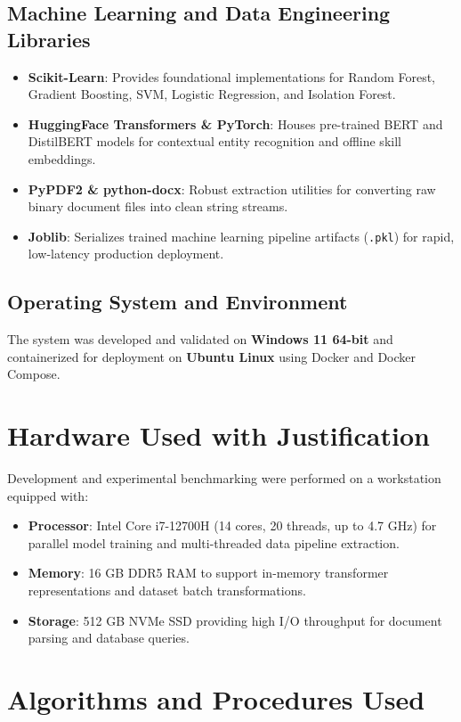 \documentclass[12pt,a4paper]{report}
\begin{document}
\subsection{Machine Learning and Data Engineering Libraries}
\label{subsec:ml_libs}
\begin{itemize}
    \item \textbf{Scikit-Learn}: Provides foundational implementations for Random Forest, Gradient Boosting, SVM, Logistic Regression, and Isolation Forest.
    \item \textbf{HuggingFace Transformers \& PyTorch}: Houses pre-trained BERT and DistilBERT models for contextual entity recognition and offline skill embeddings.
    \item \textbf{PyPDF2 \& python-docx}: Robust extraction utilities for converting raw binary document files into clean string streams.
    \item \textbf{Joblib}: Serializes trained machine learning pipeline artifacts (\texttt{.pkl}) for rapid, low-latency production deployment.
\end{itemize}

\subsection{Operating System and Environment}
The system was developed and validated on \textbf{Windows 11 64-bit} and containerized for deployment on \textbf{Ubuntu Linux} using Docker and Docker Compose.

\section{Hardware Used with Justification}
Development and experimental benchmarking were performed on a workstation equipped with:
\begin{itemize}
    \item \textbf{Processor}: Intel Core i7-12700H (14 cores, 20 threads, up to 4.7 GHz) for parallel model training and multi-threaded data pipeline extraction.
    \item \textbf{Memory}: 16 GB DDR5 RAM to support in-memory transformer representations and dataset batch transformations.
    \item \textbf{Storage}: 512 GB NVMe SSD providing high I/O throughput for document parsing and database queries.
\end{itemize}

\section{Algorithms and Procedures Used}
\end{document}
